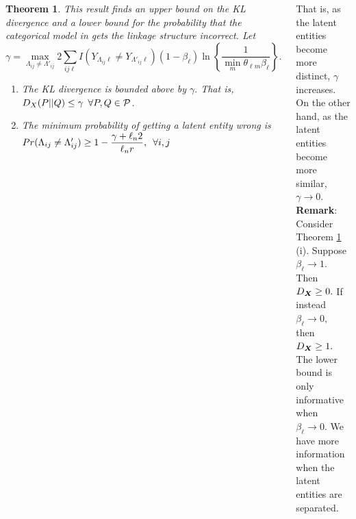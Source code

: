 \documentclass[a0paper,portrait,margin=0pt, colspace=24pt,subcolspace=0pt,blockverticalspace=36pt,innermargin=50pt]{tikzposter}
\newtheorem{theorem}{Theorem}
\begin{document}
\begin{columns}
{\begin{theorem}
\label{theorem:cat}
This result finds an upper bound on the KL divergence and a
 lower bound for the  probability that the categorical model in \cite{steorts14smered} gets the linkage structure incorrect. 
Let
$$\gamma = \max_{\Lambda_{ij} \neq \Lambda'_{ij}}
2\sum_{ij\ell} I(Y_{\Lambda_{ij}\ell} \neq Y_{\Lambda'_{ij}\ell}) (1-\beta_{\ell}) \ln \left \{
\dfrac{1}{
\min_m \theta_{\ell m} \beta_{\ell}} \right\}.$$
%
 \begin{enumerate}
\item[i)] The KL divergence is bounded above by $\gamma.$ That is,
$D_X(P || Q) \leq \gamma \enskip \forall P, Q \in \mathcal{P}$.
\item[ii)] The minimum probability of getting a latent entity wrong is
$Pr( {\Lambda}_{ij} \ne \Lambda^\prime_{ij}) \geq 1 - \dfrac{ \gamma + \ln 2}{\ln r}, \enskip \forall i,j$
\end{enumerate}
\end{theorem}
That is, as the latent entities become more distinct, $\gamma$ increases. On the other hand, as the latent entities become more similar, $\gamma \rightarrow 0.$ \\
\textbf{Remark}:
Consider Theorem \ref{theorem:cat} (i). Suppose $\beta_{\ell} \rightarrow 1.$ Then $D_{\bX} \geq 0.$ If instead $\beta_{\ell} \rightarrow 0,$ then $D_{\bX} \geq 1.$ The lower bound is only informative when $\beta_{\ell} \rightarrow 0.$ We have more information when the latent entities are separated.

\vspace*{2em}

}
\end{columns}
\end{document}
